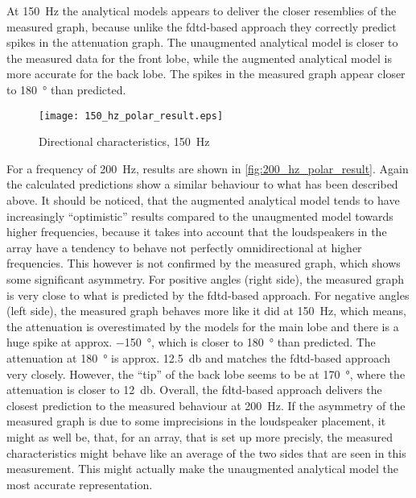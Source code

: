 At \SI{150}{\hertz} the analytical models appears to deliver the closer resemblies of the measured graph, because unlike the \gls{fdtd}-based approach they correctly predict spikes in the attenuation graph. The unaugmented analytical model is closer to the measured data for the front lobe, while the augmented analytical model is more accurate for the back lobe. The spikes in the measured graph appear closer to \SI{180}{\degree} than predicted.
\begin{figure}[H]
	\centering
	\texttt{[image: 150\_hz\_polar\_result.eps]}
	\caption{Directional characteristics, \SI{150}{\hertz}}
		\label{fig:150_hz_polar_result}
\end{figure}
For a frequency of \SI{200}{\hertz}, results are shown in \autoref{fig:200_hz_polar_result}. Again the calculated predictions show a similar behaviour to what has been described above. It should be noticed, that the augmented analytical model tends to have increasingly ``optimistic'' results compared to the unaugmented model towards higher frequencies, because it takes into account that the loudspeakers in the array have a tendency to behave not perfectly omnidirectional at higher frequencies. This however is not confirmed by the measured graph, which shows some significant asymmetry. For positive angles (right side), the measured graph is very close to what is predicted by the \gls{fdtd}-based approach. For negative angles (left side), the measured graph behaves more like it did at \SI{150}{\hertz}, which means, the attenuation is overestimated by the models for the main lobe and there is a huge spike at approx. \SI{-150}{\degree}, which is closer to \SI{180}{\degree} than predicted. The attenuation at \SI{180}{\degree} is approx. \SI{12.5}{\decibel} and matches the \gls{fdtd}-based approach very closely. However, the ``tip'' of the back lobe seems to be at \SI{170}{\degree}, where the attenuation is closer to \SI{12}{\decibel}. Overall, the \gls{fdtd}-based approach delivers the closest prediction to the measured behaviour at \SI{200}{\hertz}. If the asymmetry of the measured graph is due to some imprecisions in the loudspeaker placement, it might as well be, that, for an array, that is set up more precisly, the measured characteristics might behave like an average of the two sides that are seen in this measurement. This might actually make the unaugmented analytical model the most accurate representation.
